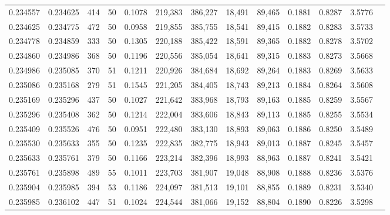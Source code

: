 \begin{tabular}{rrrrrrrrrrrrr}
0.234557 & 0.234625 &   414 &  50 &                                     0.1078 & 219,383 & 386,227 &  18,491 &  89,465 & 0.1881 & 0.8287 & 3.5776 \\
0.234625 & 0.234775 &   472 &  50 &                                     0.0958 & 219,855 & 385,755 &  18,541 &  89,415 & 0.1882 & 0.8283 & 3.5733 \\
0.234778 & 0.234859 &   333 &  50 &                                     0.1305 & 220,188 & 385,422 &  18,591 &  89,365 & 0.1882 & 0.8278 & 3.5702 \\
0.234860 & 0.234986 &   368 &  50 &                                     0.1196 & 220,556 & 385,054 &  18,641 &  89,315 & 0.1883 & 0.8273 & 3.5668 \\
0.234986 & 0.235085 &   370 &  51 &                                     0.1211 & 220,926 & 384,684 &  18,692 &  89,264 & 0.1883 & 0.8269 & 3.5633 \\
0.235086 & 0.235168 &   279 &  51 &                                     0.1545 & 221,205 & 384,405 &  18,743 &  89,213 & 0.1884 & 0.8264 & 3.5608 \\
0.235169 & 0.235296 &   437 &  50 &                                     0.1027 & 221,642 & 383,968 &  18,793 &  89,163 & 0.1885 & 0.8259 & 3.5567 \\
0.235296 & 0.235408 &   362 &  50 &                                     0.1214 & 222,004 & 383,606 &  18,843 &  89,113 & 0.1885 & 0.8255 & 3.5534 \\
0.235409 & 0.235526 &   476 &  50 &                                     0.0951 & 222,480 & 383,130 &  18,893 &  89,063 & 0.1886 & 0.8250 & 3.5489 \\
0.235530 & 0.235633 &   355 &  50 &                                     0.1235 & 222,835 & 382,775 &  18,943 &  89,013 & 0.1887 & 0.8245 & 3.5457 \\
0.235633 & 0.235761 &   379 &  50 &                                     0.1166 & 223,214 & 382,396 &  18,993 &  88,963 & 0.1887 & 0.8241 & 3.5421 \\
0.235761 & 0.235898 &   489 &  55 &                                     0.1011 & 223,703 & 381,907 &  19,048 &  88,908 & 0.1888 & 0.8236 & 3.5376 \\
0.235904 & 0.235985 &   394 &  53 &                                     0.1186 & 224,097 & 381,513 &  19,101 &  88,855 & 0.1889 & 0.8231 & 3.5340 \\
0.235985 & 0.236102 &   447 &  51 &                                     0.1024 & 224,544 & 381,066 &  19,152 &  88,804 & 0.1890 & 0.8226 & 3.5298 \\

\end{tabular}
